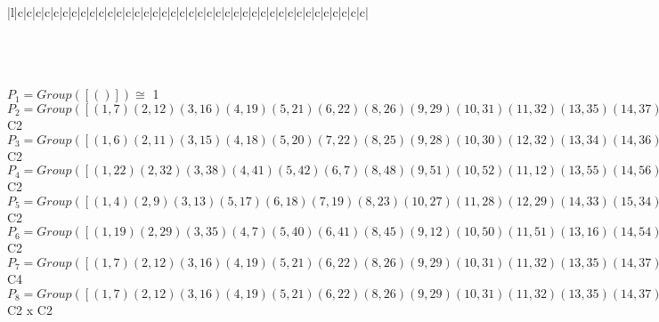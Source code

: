 \documentclass[varwidth=\maxdimen,border=10]{standalone}
\begin{document}
\begin{tabular}
\begin{array}{|l|c|c|c|c|c|c|c|c|c|c|c|c|c|c|c|c|c|c|c|c|c|c|c|c|c|c|c|c|c|c|c|c|c|c|c|c|c|c|c|}
\end{array}\)\\
\ \\
\ \\
$P_{1} = Group( [ () ] )\cong$ 1\ \\
$P_{2} = Group( [ ( 1, 7)( 2,12)( 3,16)( 4,19)( 5,21)( 6,22)( 8,26)( 9,29)(10,31)(11,32)(13,35)(14,37)(15,38)(17,40)(18,41)(20,42)(23,45)(24,47)(25,48)(27,50)(28,51)(30,52)(33,54)(34,55)(36,56)(39,57)(43,59)(44,60)(46,61)(49,62)(53,63)(58,64) ] )\cong$ C2\ \\
$P_{3} = Group( [ ( 1, 6)( 2,11)( 3,15)( 4,18)( 5,20)( 7,22)( 8,25)( 9,28)(10,30)(12,32)(13,34)(14,36)(16,38)(17,39)(19,41)(21,42)(23,44)(24,46)(26,48)(27,49)(29,51)(31,52)(33,53)(35,55)(37,56)(40,57)(43,58)(45,60)(47,61)(50,62)(54,63)(59,64) ] )\cong$ C2\ \\
$P_{4} = Group( [ ( 1,22)( 2,32)( 3,38)( 4,41)( 5,42)( 6, 7)( 8,48)( 9,51)(10,52)(11,12)(13,55)(14,56)(15,16)(17,57)(18,19)(20,21)(23,60)(24,61)(25,26)(27,62)(28,29)(30,31)(33,63)(34,35)(36,37)(39,40)(43,64)(44,45)(46,47)(49,50)(53,54)(58,59) ] )\cong$ C2\ \\
$P_{5} = Group( [ ( 1, 4)( 2, 9)( 3,13)( 5,17)( 6,18)( 7,19)( 8,23)(10,27)(11,28)(12,29)(14,33)(15,34)(16,35)(20,39)(21,40)(22,41)(24,43)(25,44)(26,45)(30,49)(31,50)(32,51)(36,53)(37,54)(38,55)(42,57)(46,58)(47,59)(48,60)(52,62)(56,63)(61,64) ] )\cong$ C2\ \\
$P_{6} = Group( [ ( 1,19)( 2,29)( 3,35)( 4, 7)( 5,40)( 6,41)( 8,45)( 9,12)(10,50)(11,51)(13,16)(14,54)(15,55)(17,21)(18,22)(20,57)(23,26)(24,59)(25,60)(27,31)(28,32)(30,62)(33,37)(34,38)(36,63)(39,42)(43,47)(44,48)(46,64)(49,52)(53,56)(58,61) ] )\cong$ C2\ \\
$P_{7} = Group( [ ( 1, 7)( 2,12)( 3,16)( 4,19)( 5,21)( 6,22)( 8,26)( 9,29)(10,31)(11,32)(13,35)(14,37)(15,38)(17,40)(18,41)(20,42)(23,45)(24,47)(25,48)(27,50)(28,51)(30,52)(33,54)(34,55)(36,56)(39,57)(43,59)(44,60)(46,61)(49,62)(53,63)(58,64), ( 1,17, 7,40)( 2,27,12,50)( 3,33,16,54)( 4, 5,19,21)( 6,39,22,57)( 8,43,26,59)( 9,10,29,31)(11,49,32,62)(13,14,35,37)(15,53,38,63)(18,20,41,42)(23,24,45,47)(25,58,48,64)(28,30,51,52)(34,36,55,56)(44,46,60,61) ] )\cong$ C4\ \\
$P_{8} = Group( [ ( 1, 7)( 2,12)( 3,16)( 4,19)( 5,21)( 6,22)( 8,26)( 9,29)(10,31)(11,32)(13,35)(14,37)(15,38)(17,40)(18,41)(20,42)(23,45)(24,47)(25,48)(27,50)(28,51)(30,52)(33,54)(34,55)(36,56)(39,57)(43,59)(44,60)(46,61)(49,62)(53,63)(58,64), ( 1, 6)( 2,11)( 3,15)( 4,18)( 5,20)( 7,22)( 8,25)( 9,28)(10,30)(12,32)(13,34)(14,36)(16,38)(17,39)(19,41)(21,42)(23,44)(24,46)(26,48)(27,49)(29,51)(31,52)(33,53)(35,55)(37,56)(40,57)(43,58)(45,60)(47,61)(50,62)(54,63)(59,64) ] )\cong$ C2 x C2\ \\

\end{tabular}
\end{document}
